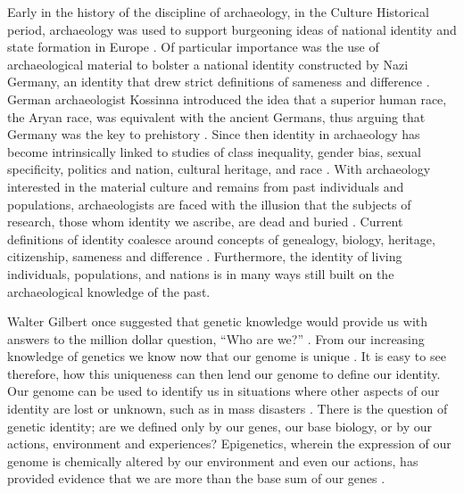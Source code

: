 Early  in the history of the discipline of archaeology, in the Culture Historical period, archaeology was used to support burgeoning ideas of national identity and state formation in Europe \parencite{Meskell_2002}. Of particular importance was the use of archaeological material to bolster a national identity constructed by Nazi Germany, an identity that drew strict definitions of sameness and difference \parencite{Arnold_1990}. German archaeologist Kossinna introduced the idea that a superior human race, the Aryan race, was equivalent with the ancient Germans, thus arguing that Germany was the key to prehistory \parencite{Arnold_1992}. Since then identity in archaeology has become intrinsically linked to studies of class inequality, gender bias, sexual specificity, politics and nation, cultural heritage, and race \parencite{Fisher_2003}. 
With archaeology interested in the material culture and remains from past individuals and populations, archaeologists are faced with the illusion that the subjects of research, those whom identity we ascribe, are dead and buried \parencite{Meskell_2002}. Current definitions of identity coalesce around concepts of genealogy, biology, heritage, citizenship, sameness and difference \parencite{Meskell_2002}. Furthermore, the identity of living individuals, populations, and nations is in many ways still built on the archaeological knowledge of the past.


Walter Gilbert once suggested that genetic knowledge would provide us with answers to the million dollar question, “Who are we?” \parencite{Zeiler_2007}. From our increasing knowledge of genetics we know now that our genome is unique \parencite{Zeiler_2007}. It is easy to see therefore, how this uniqueness can then lend our genome to define our identity. Our genome can be used to identify us in situations where other aspects of our identity are lost or unknown, such as in mass disasters \parencite{Hartman_2011}. There is the question of genetic identity; are we defined only by our genes, our base biology, or by our actions, environment and experiences? Epigenetics, wherein the expression of our genome is chemically altered by our environment and even our actions, has provided evidence that we are more than the base sum of our genes \parencite{Lock_2015}.

